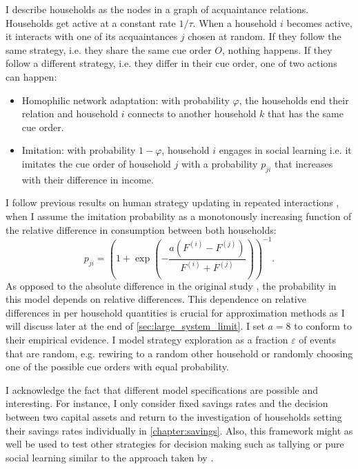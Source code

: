 I describe households as the nodes in a graph of acquaintance relations. Households get active at a constant rate $1/\tau$. When a household $i$ becomes active, it interacts with one of its acquaintances $j$ chosen at random. If they follow the same strategy, i.e. they share the same cue order $O$, nothing happens. If they follow a different strategy, i.e. they differ in their cue order, one of two actions can happen:
\begin{itemize}
	\item Homophilic network adaptation: with probability $\varphi$, the households end their relation and household $i$ connects to another household $k$ that has the same cue order. 
	\item Imitation: with probability $1-\varphi$, household $i$ engages in social learning i.e. it imitates the cue order of household $j$ with a probability $p_{ji}$ that increases with their difference in income.
\end{itemize}
I follow previous results on human strategy updating in repeated interactions \citep{Traulsen2010}, when I assume the imitation probability as a monotonously increasing function of the relative difference in consumption between both households:
\begin{equation}
	p_{ji} =  \left(1 + \exp \left(- \frac{a(F^{(i)} - F^{(j)})}{F^{(i)} + F^{(j)}} \right) \right)^{-1}.
    \label{eq:imitation_probability}
\end{equation}
As opposed to the absolute difference in the original study \citep{Traulsen2010}, the probability in this model depends on relative differences. This dependence on relative differences in per household quantities is crucial for approximation methods as I will discuss later at the end of \ref{sec:large_system_limit}.
I set $a = 8$ to conform to their empirical evidence.
I model strategy exploration as a fraction $\varepsilon$ of events that are random, e.g. rewiring to a random other household or randomly choosing one of the possible cue orders with equal probability.

I acknowledge the fact that different model specifications are possible and interesting.
For instance, I only consider fixed savings rates and the decision between two capital assets and return to the investigation of households setting their savings rates individually in \cref{chapter:savings}.
Also, this framework might as well be used to test other strategies for decision making such as tallying or pure social learning similar to the approach taken by \cite{Barkoczi2013, Barkoczi2016}.

